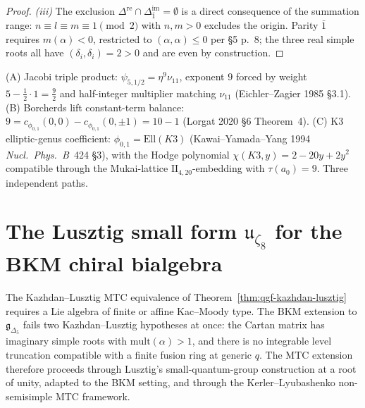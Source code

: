 \begin{proof}
\emph{(iii)} The exclusion
$\Delta^{\mathrm{re}}\cap\Delta^{\mathrm{im}}_{\bar 1}=\emptyset$ is a
direct consequence of the summation range: $n\equiv l\equiv m\equiv 1\pmod 2$
with $n,m>0$ excludes the origin. Parity $\bar 1$ requires $m(\alpha)<0$,
restricted to $(\alpha,\alpha)\leq 0$ per §5 p.~8; the three real simple
roots all have $(\delta_i,\delta_i)=2>0$ and are even by construction.
\end{proof}

\begin{remark}[Three-path verification of \texorpdfstring{$\tau=9$}{tau=9}]
\label{rem:qgfnd-tau-9-three-paths}
(A) Jacobi triple product: $\psi_{5,1/2}=\eta^9\nu_{11}$, exponent $9$
forced by weight $5-\tfrac{1}{2}\cdot 1=\tfrac{9}{2}$ and half-integer
multiplier matching $\nu_{11}$ (Eichler--Zagier 1985 §3.1).
(B) Borcherds lift constant-term balance:
$9=c_{\phi_{0,1}}(0,0)-c_{\phi_{0,1}}(0,\pm 1)=10-1$ (Lorgat 2020 §6
Theorem~4).
(C) K3 elliptic-genus coefficient: $\phi_{0,1}=\mathrm{Ell}(K3)$
(Kawai--Yamada--Yang 1994 \emph{Nucl.~Phys.~B}~424 §3), with the
Hodge polynomial $\chi(K3,y)=2-20y+2y^2$ compatible through the
Mukai-lattice $\mathrm{II}_{4,20}$-embedding with $\tau(a_0)=9$.
Three independent paths.
\end{remark}

\section{The Lusztig small form \texorpdfstring{$\mathfrak u_{\zeta_8}$}{u-zeta-8} for the BKM chiral bialgebra}
\label{sec:qgf-lusztig-small-form-zeta8}

The Kazhdan--Lusztig MTC equivalence of
Theorem~\ref{thm:qgf-kazhdan-lusztig} requires a Lie algebra of finite
or affine Kac--Moody type. The BKM extension to
$\mathfrak g_{\Delta_5}$ fails two Kazhdan--Lusztig hypotheses at
once: the Cartan matrix has imaginary simple roots with
$\mathrm{mult}(\alpha)>1$, and there is no integrable level truncation
compatible with a finite fusion ring at generic $q$. The MTC extension
therefore proceeds through Lusztig's small-quantum-group construction
at a root of unity, adapted to the BKM setting, and through the
Kerler--Lyubashenko non-semisimple MTC framework.

